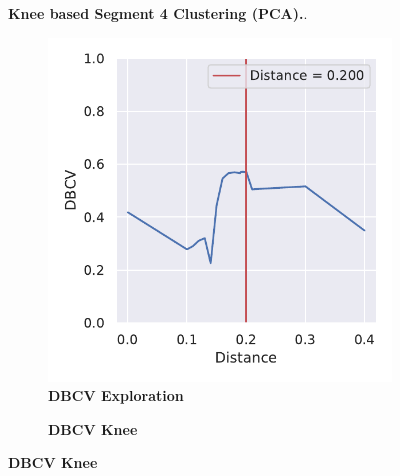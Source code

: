 \begin{figure}[!hbt]
\begin{subfigure}[b]{0.475\textwidth}
    \end{subfigure}
    \caption[Knee based Segment 4 Clustering (\Acrshort{PCA})]{\textbf{Knee based Segment 4 Clustering (\Acrshort{PCA}).}.}
    \label{fig:PCA_Cluster_Knee_4}
\end{figure}

\begin{figure}[!hbt]
    \centering
    \begin{subfigure}[b]{0.475\textwidth}
        \caption[\Acrshort{DBCV} Exploration]{\textbf{\Acrshort{DBCV} Exploration}}
        \label{subfig:PCA_Cluster_DBCV_Explo_4}            \includegraphics[width=\textwidth]{PCA/Cluster_DBCV_Segment_4.pdf}
    \end{subfigure}
    \hfill
    \begin{subfigure}[b]{0.475\textwidth}
        \caption[\Acrshort{DBCV} Knee]{\textbf{\Acrshort{DBCV} Knee}}

\end{subfigure}
\end{figure}
